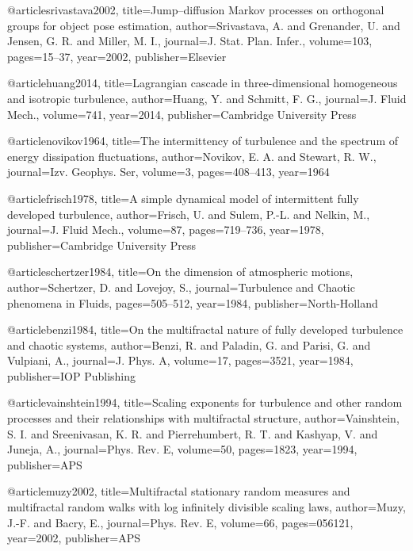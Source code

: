 
@article{srivastava2002,
  title={{Jump--diffusion Markov processes on orthogonal groups for object pose estimation}},
  author={Srivastava, A. and Grenander, U. and Jensen, G. R. and Miller, M. I.},
  journal={J. Stat. Plan. Infer.},
  volume={103},
  pages={15--37},
  year={2002},
  publisher={Elsevier}
}


@article{huang2014,
  title={{La\-gran\-gian cas\-ca\-de in three-dimensional ho\-mo\-ge\-neous and isotropic turbulence}},
  author={Huang, Y. and Schmitt, F. G.},
  journal={J. Fluid Mech.},
  volume={741},
  year={2014},
  publisher={Cambridge University Press}
}


@article{novikov1964,
  title={{The intermittency of turbulence and the spectrum of energy dissipation fluctuations}},
  author={Novikov, E. A. and Stewart, R. W.},
  journal={Izv. Geophys. Ser},
  volume={3},
  pages={408--413},
  year={1964}
}

@article{frisch1978,
  title={{A simple dynamical model of intermittent fully developed turbulence}},
  author={Frisch, U. and Sulem, P.-L. and Nelkin, M.},
  journal={J. Fluid Mech.},
  volume={87},
  pages={719--736},
  year={1978},
  publisher={Cambridge University Press}
}

@article{schertzer1984,
  title={{On the dimension of atmospheric motions}},
  author={Schertzer, D. and Lovejoy, S.},
  journal={Turbulence and Chaotic phenomena in Fluids},
  pages={505--512},
  year={1984},
  publisher={North-Holland}
}

@article{benzi1984,
  title={{On the multifractal nature of fully developed turbulence and chaotic systems}},
  author={Benzi, R. and Paladin, G. and Parisi, G. and Vulpiani, A.},
  journal={J. Phys. A},
  volume={17},
  pages={3521},
  year={1984},
  publisher={IOP Publishing}
}

@article{vainshtein1994,
  title={{Scaling exponents for turbulence and other random processes and their relationships with multifractal structure}},
  author={Vainshtein, S. I. and Sreenivasan, K. R. and Pierrehumbert, R. T. and Kashyap, V. and Juneja, A.},
  journal={Phys. Rev. E},
  volume={50},
  pages={1823},
  year={1994},
  publisher={APS}
}

@article{muzy2002,
  title={{Multifractal stationary random measures and multifractal random walks with log infinitely divisible scaling laws}},
  author={Muzy, J.-F. and Bacry, E.},
  journal={Phys. Rev. E},
  volume={66},
  pages={056121},
  year={2002},
  publisher={APS}
}

